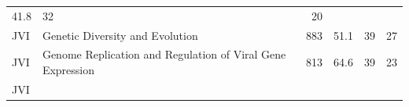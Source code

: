 \documentclass[11pt,]{article}
\begin{document}
\begin{longtable}[]{@{}llrrrr@{}}
\begin{minipage}[t]{0.08\columnwidth}
41.8\strut
\end{minipage} & \begin{minipage}[t]{0.11\columnwidth}\raggedleft\strut
32\strut
\end{minipage} & \begin{minipage}[t]{0.11\columnwidth}\raggedleft\strut
20\strut
\end{minipage}\tabularnewline
\begin{minipage}[t]{0.06\columnwidth}\raggedright\strut
JVI\strut
\end{minipage} & \begin{minipage}[t]{0.43\columnwidth}\raggedright\strut
Genetic Diversity and Evolution\strut
\end{minipage} & \begin{minipage}[t]{0.04\columnwidth}\raggedleft\strut
883\strut
\end{minipage} & \begin{minipage}[t]{0.08\columnwidth}\raggedleft\strut
51.1\strut
\end{minipage} & \begin{minipage}[t]{0.11\columnwidth}\raggedleft\strut
39\strut
\end{minipage} & \begin{minipage}[t]{0.11\columnwidth}\raggedleft\strut
27\strut
\end{minipage}\tabularnewline
\begin{minipage}[t]{0.06\columnwidth}\raggedright\strut
JVI\strut
\end{minipage} & \begin{minipage}[t]{0.43\columnwidth}\raggedright\strut
Genome Replication and Regulation of Viral Gene Expression\strut
\end{minipage} & \begin{minipage}[t]{0.04\columnwidth}\raggedleft\strut
813\strut
\end{minipage} & \begin{minipage}[t]{0.08\columnwidth}\raggedleft\strut
64.6\strut
\end{minipage} & \begin{minipage}[t]{0.11\columnwidth}\raggedleft\strut
39\strut
\end{minipage} & \begin{minipage}[t]{0.11\columnwidth}\raggedleft\strut
23\strut
\end{minipage}\tabularnewline
\begin{minipage}[t]{0.06\columnwidth}\raggedright\strut
JVI\strut
\end{minipage} & \begin{minipage}[t]{0.43\columnwidth}\raggedright\strut

\end{minipage}
\end{longtable}
\end{document}
